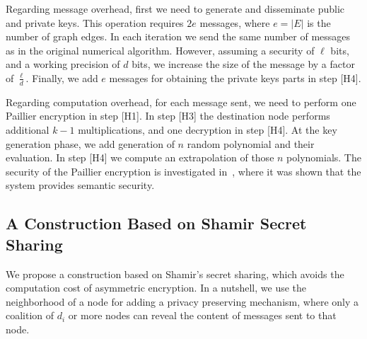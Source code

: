 \documentclass[10pt]{svjour3}
\begin{document}
Regarding message overhead, first we need to generate and
disseminate public and private keys. This operation requires $2e$
messages, where $e = |E|$ is the number of graph edges. In each
iteration we send the same number of messages as in the original
numerical algorithm. However, assuming a security of $\ell$ bits,
and a working precision of $d$ bits, we increase the size of the
message by a factor of $\frac{ \ell}{d}$. Finally, we add $e$
messages for obtaining the private keys parts in step [H4].

Regarding computation overhead, for each message sent, we need to
perform one Paillier encryption in step [H1]. In step [H3] the
destination node performs additional $k-1$ multiplications, and
one decryption in step [H4]. At the key generation phase, we add
generation of $n$ random polynomial and their evaluation. In step
[H4] we compute an extrapolation of those $n$ polynomials.
The security of the Paillier encryption is investigated
in~\cite{Paillier,Paillier2}, where it was shown that the system
provides semantic security.

\subsection{A Construction Based on Shamir Secret Sharing}
\label{our_SSS}
We propose a  construction based on Shamir's secret sharing,
which avoids the computation cost of asymmetric encryption. In a
nutshell, we use the neighborhood of a node for adding a privacy
preserving mechanism, where only a coalition of $d_i$ or more nodes
can reveal the content of messages sent to that node.
\end{document}
